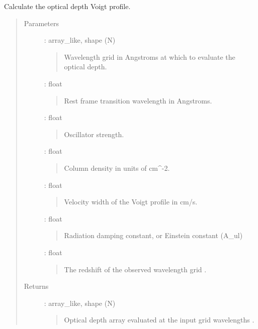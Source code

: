\documentclass[letterpaper,10pt,english]{sphinxmanual}
\begin{document}

\begin{fulllineitems}
\label{\detokenize{api:voigt.Voigt}}
Calculate the optical depth Voigt profile.
\begin{quote}\begin{description}
\item[{Parameters}] \leavevmode
{} : array\_like, shape (N)
\begin{quote}

Wavelength grid in Angstroms at which to evaluate the optical depth.
\end{quote}

 : float
\begin{quote}

Rest frame transition wavelength in Angstroms.
\end{quote}

 : float
\begin{quote}

Oscillator strength.
\end{quote}

 : float
\begin{quote}

Column density in units of cm\textasciicircum{}-2.
\end{quote}

 : float
\begin{quote}

Velocity width of the Voigt profile in cm/s.
\end{quote}

 : float
\begin{quote}

Radiation damping constant, or Einstein constant (A\_ul)
\end{quote}

 : float
\begin{quote}

The redshift of the observed wavelength grid .
\end{quote}

\item[{Returns}] \leavevmode
{} : array\_like, shape (N)
\begin{quote}

Optical depth array evaluated at the input grid wavelengths .
\end{quote}

\end{description}\end{quote}

\end{fulllineitems}
\end{document}
